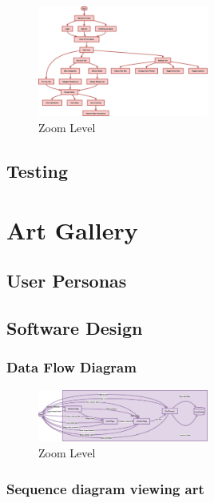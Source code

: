 \documentclass[]{project_final}
\begin{document}
\begin{figure}[ht!]
  \centering
  \includegraphics[width=0.5\textwidth]{MRAuserflow.png}
  \vspace*{0.0cm}
  \caption{Zoom Level}
  \label{fig:1}
\end{figure}


\subsection{Testing}
\section{Art Gallery}
\subsection{User Personas}
\subsection{Software Design}
\subsubsection{Data Flow Diagram}
\begin{figure}[ht!]
  \centering
  \includegraphics[width=0.5\textwidth]{DataFlowDiagram.png}
  \vspace*{0.0cm}
  \caption{Zoom Level}
  \label{fig:1}
\end{figure}
\newpage
\subsubsection{Sequence diagram viewing art}
\end{document}
